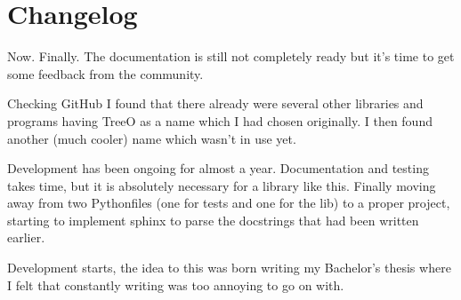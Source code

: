 \documentclass[a4paper,10pt,english]{sphinxmanual}
\begin{document}
\begin{fulllineitems}

\begin{fulllineitems}
\label{\detokenize{fagus.utils:fagus.utils.FagusMeta.__module__}}
\pysigstartsignatures
{}
\pysigstopsignatures
\end{fulllineitems}


\end{fulllineitems}


\sphinxstepscope


\chapter{Changelog}
\label{\detokenize{CHANGELOG:changelog}}\label{\detokenize{CHANGELOG::doc}}
\sphinxAtStartPar
{}

\sphinxAtStartPar
Now. Finally. The documentation is still not completely ready but it’s time to get some feedback from the community.

\sphinxAtStartPar
{}

\sphinxAtStartPar
Checking GitHub I found that there already were several other libraries and programs having TreeO as a name which I had chosen originally. I then found another (much cooler) name which wasn’t in use yet.

\sphinxAtStartPar
{}

\sphinxAtStartPar
Development has been ongoing for almost a year. Documentation and testing takes time, but it is absolutely necessary for a library like this. Finally moving away from two Python\sphinxhyphen{}files (one for tests and one for the lib) to a proper \sphinxhyphen{}project, starting to implement sphinx to parse the docstrings that had been written earlier.

\sphinxAtStartPar
{}

\sphinxAtStartPar
Development starts, the idea to this was born writing my Bachelor’s thesis where I felt that constantly writing  was too annoying to go on with.
\end{document}
